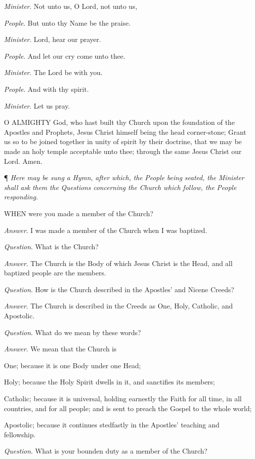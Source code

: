 \emph{Minister}. Not unto us, O Lord, not unto us,

\emph{People}. But unto thy Name be the praise. 

\emph{Minister}. Lord, hear our prayer. 

\emph{People}. And let our cry come unto thee. 

\emph{Minister}. The Lord be with you. 

\emph{People}. And with thy spirit. 

\emph{Minister}. Let us pray.

O
ALMIGHTY God, who hast built thy Church upon the foundation of the Apostles
and Prophets, Jesus Christ himself being the head corner-stone; Grant
us so to be joined together in unity of spirit by their doctrine, that
we may be made an holy temple acceptable unto thee; through the same Jesus
Christ our Lord. Amen.

¶
\emph{Here may be sung a Hymn, after which, the People being seated, the
Minister shall ask them the Questions concerning the Church which follow,
the People responding.}

WHEN
were you made a member of the Church?

\emph{Answer}. I was made a member of the Church when I was baptized.

\emph{Question}. What is the Church?

\emph{Answer}. The Church is the Body of which Jesus
Christ is the Head, and all baptized people are the members.

\emph{Question}. How is the Church described in the
Apostles' and Nicene Creeds?

\emph{Answer}. The Church is described in the Creeds
as One, Holy, Catholic, and Apostolic.

\emph{Question}. What do we mean by these words?

\emph{Answer}. We mean that the Church is 

One; because it is one Body under one Head; 

Holy; because the Holy Spirit dwells in it, and sanctifies
its members; 

Catholic; because it is universal, holding earnestly
the Faith for all time, in all countries, and for all people; and is sent
to preach the Gospel to the whole world; 

Apostolic; because it continues stedfastly in the Apostles'
teaching and fellowship.

\emph{Question}. What is your bounden duty as a member
of the Church?

